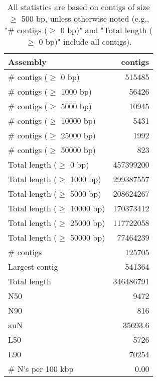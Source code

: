 \documentclass[12pt,a4paper]{article}
\begin{document}
\begin{table}[ht]
\begin{center}
\caption{All statistics are based on contigs of size $\geq$ 500 bp, unless otherwise noted (e.g., "\# contigs ($\geq$ 0 bp)" and "Total length ($\geq$ 0 bp)" include all contigs).}
\begin{tabular}{|l*{1}{|r}|}
\hline
Assembly & contigs \\ \hline
\# contigs ($\geq$ 0 bp) & 515485 \\ \hline
\# contigs ($\geq$ 1000 bp) & 56426 \\ \hline
\# contigs ($\geq$ 5000 bp) & 10945 \\ \hline
\# contigs ($\geq$ 10000 bp) & 5431 \\ \hline
\# contigs ($\geq$ 25000 bp) & 1992 \\ \hline
\# contigs ($\geq$ 50000 bp) & 823 \\ \hline
Total length ($\geq$ 0 bp) & 457399200 \\ \hline
Total length ($\geq$ 1000 bp) & 299387557 \\ \hline
Total length ($\geq$ 5000 bp) & 208624267 \\ \hline
Total length ($\geq$ 10000 bp) & 170373412 \\ \hline
Total length ($\geq$ 25000 bp) & 117722058 \\ \hline
Total length ($\geq$ 50000 bp) & 77464239 \\ \hline
\# contigs & 125705 \\ \hline
Largest contig & 541364 \\ \hline
Total length & 346486791 \\ \hline
N50 & 9472 \\ \hline
N90 & 816 \\ \hline
auN & 35693.6 \\ \hline
L50 & 5726 \\ \hline
L90 & 70254 \\ \hline
\# N's per 100 kbp & 0.00 \\ \hline
\end{tabular}
\end{center}
\end{table}
\end{document}
